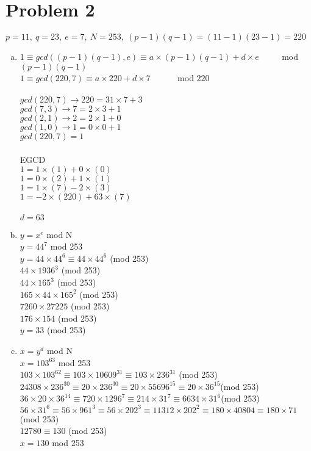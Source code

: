 \documentclass[11pt,letterpaper]{article}
\begin{document}
\section*{Problem 2}
$p=11,~q=23,~e=7,~N=253,~(p-1)(q-1)=(11-1)(23-1)=220$\\
\begin{enumerate}[(a)]
\item
$1\equiv gcd((p-1)(q-1),e)\equiv a\times (p-1)(q-1) + d\times e$ ~~~~  mod $(p-1)(q-1)$\\
$1\equiv gcd(220,7)\equiv a\times 220 + d\times 7$ ~~~~~ mod $220$\\
\\
$gcd(220,7)\rightarrow 220 = 31\times7 + 3$\\
$gcd(7,3)\rightarrow 7= 2\times3 + 1$\\
$gcd(2,1)\rightarrow 2 = 2\times1 + 0$\\
$gcd(1,0)\rightarrow 1= 0\times0 + 1$\\
$gcd(220,7)=1$\\
\\
EGCD\\
$1 = 1\times(1) + 0\times(0)$\\
$1 = 0\times(2) + 1\times(1)$\\
$1 = 1\times(7) - 2\times(3)$\\
$1 = -2\times(220) + 63\times(7)$\\
\\
$d = 63$\\
\item
$y=x^{e}$ mod N\\
$y=44^{7}$ mod 253\\
$y=44\times44^{6} \equiv 44\times44^{6}$ (mod 253)\\
$44\times1936^{3}$ (mod 253)\\
$44\times165^{3}$ (mod 253)\\
$165\times44\times165^{2}$ (mod 253)\\
$7260\times27225$ (mod 253)\\
$176\times154$ (mod 253)\\
$y=33$ (mod 253)
\item
$x=y^{d}$ mod N\\
$x = 103^{63}$ mod 253\\
$103\times103^{62}\equiv 103\times10609^{31} \equiv 103\times236^{31}$ (mod 253)\\
$24308\times236^{30} \equiv  20\times 236^{30} \equiv 20\times55696^{15} \equiv 20\times 36^{15}$(mod 253)\\
$36\times20\times36^{14} \equiv 720\times1296^{7} \equiv 214\times 31^{7} \equiv 6634\times31^{6}$(mod 253)\\
$56\times31^{6}\equiv 56\times 961^{3}\equiv 56\times202^{3}\equiv
11312\times202^2\equiv 180\times40804\equiv 180\times71$ (mod 253)\\
$12780\equiv 130$ (mod 253)\\
$x = 130$ mod 253
\end{enumerate}
\clearpage
\end{document}
